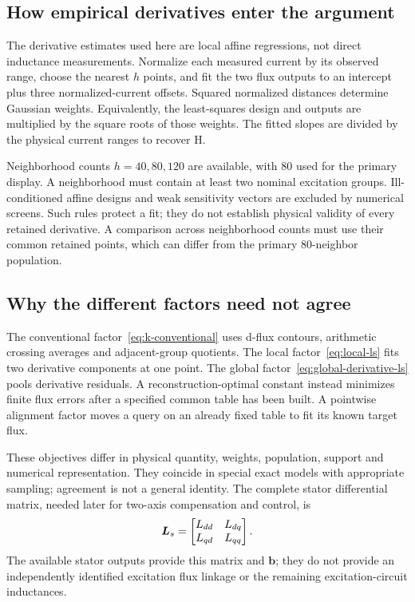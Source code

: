 \subsection{How empirical derivatives enter the argument}
The derivative estimates used here are local affine regressions, not direct inductance measurements. Normalize each measured current by its observed range, choose the nearest $h$ points, and fit the two flux outputs to an intercept plus three normalized-current offsets. Squared normalized distances determine Gaussian weights. Equivalently, the least-squares design and outputs are multiplied by the square roots of those weights. The fitted slopes are divided by the physical current ranges to recover H.

Neighborhood counts $h=40,80,120$ are available, with 80 used for the primary display. A neighborhood must contain at least two nominal excitation groups. Ill-conditioned affine designs and weak sensitivity vectors are excluded by numerical screens. Such rules protect a fit; they do not establish physical validity of every retained derivative. A comparison across neighborhood counts must use their common retained points, which can differ from the primary 80-neighbor population.

\subsection{Why the different factors need not agree}
The conventional factor~\eqref{eq:k-conventional} uses d-flux contours, arithmetic crossing averages and adjacent-group quotients. The local factor~\eqref{eq:local-ls} fits two derivative components at one point. The global factor~\eqref{eq:global-derivative-ls} pools derivative residuals. A reconstruction-optimal constant instead minimizes finite flux errors after a specified common table has been built. A pointwise alignment factor moves a query on an already fixed table to fit its known target flux.

These objectives differ in physical quantity, weights, population, support and numerical representation. They coincide in special exact models with appropriate sampling; agreement is not a general identity. The complete stator differential matrix, needed later for two-axis compensation and control, is
\begin{equation}\label{eq:differential-matrix}
\bm L_s=\begin{bmatrix}L_{dd}&L_{dq}\\L_{qd}&L_{qq}\end{bmatrix}.
\end{equation}
The available stator outputs provide this matrix and $\bm b$; they do not provide an independently identified excitation flux linkage or the remaining excitation-circuit inductances.
